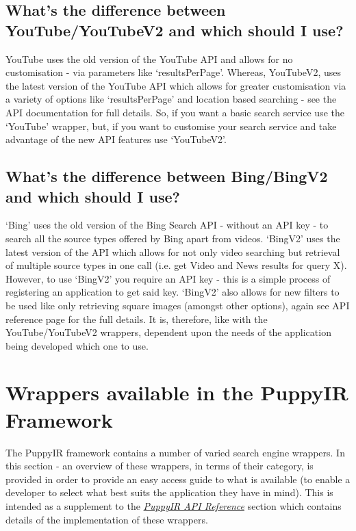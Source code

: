 \documentclass[letterpaper,10pt,english]{sphinxmanual}
\begin{document}
\subsection{What's the difference between YouTube/YouTubeV2 and which should I use?}
\label{faq:what-s-the-difference-between-youtube-youtubev2-and-which-should-i-use}
YouTube uses the old version of the YouTube API and allows for no customisation - via parameters like `resultsPerPage'. Whereas, YouTubeV2, uses the latest version of the YouTube API which allows for greater customisation via a variety of options like `resultsPerPage' and location based searching - see the API documentation for full details. So, if you want a basic search service use the `YouTube' wrapper, but, if you want to customise your search service and take advantage of the new API features use `YouTubeV2'.


\subsection{What's the difference between Bing/BingV2 and which should I use?}
\label{faq:what-s-the-difference-between-bing-bingv2-and-which-should-i-use}
`Bing' uses the old version of the Bing Search API - without an API key - to search all the source types offered by Bing apart from videos. `BingV2' uses the latest version of the API which allows for not only video searching but retrieval of multiple source types in one call (i.e. get Video and News results for query X). However, to use `BingV2' you require an API key - this is a simple process of registering an application to get said key. `BingV2' also allows for new filters to be used like only retrieving square images (amongst other options), again see API reference page for the full details. It is, therefore, like with the YouTube/YouTubeV2 wrappers, dependent upon the needs of the application being developed which one to use.


\section{Wrappers available in the PuppyIR Framework}
\label{wrappers:wrappers}\label{wrappers:wrappers-available-in-the-puppyir-framework}\label{wrappers::doc}
The PuppyIR framework contains a number of varied search engine wrappers. In this section - an overview of these wrappers, in terms of their category, is provided in order to provide an easy access guide to what is available (to enable a developer to select what best suits the application they have in mind). This is intended as a supplement to the {\hyperref[api2.0:api]{\emph{PuppyIR API Reference}}} section which contains details of the implementation of these wrappers.
\end{document}
